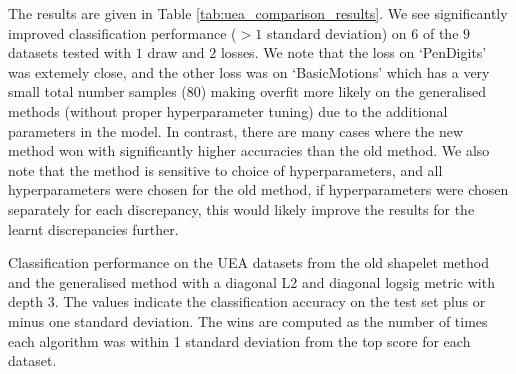 The results are given in Table \ref{tab:uea_comparison_results}. We see significantly improved classification performance ($> 1$ standard deviation) on $6$ of the $9$ datasets tested with $1$ draw and $2$ losses. We note that the loss on `PenDigits' was extemely close, and the other loss was on `BasicMotions' which has a very small total number samples ($80$) making overfit more likely on the generalised methods (without proper hyperparameter tuning) due to the additional parameters in the model. In contrast, there are many cases where the new method won with significantly higher accuracies than the old method. We also note that the method is sensitive to choice of hyperparameters, and all hyperparameters were chosen for the old method, if hyperparameters were chosen separately for each discrepancy, this would likely improve the results for the learnt discrepancies further.
\begin{table}[ht]
    \centering
    \caption{Classification performance on the UEA datasets from the old shapelet method and the generalised method with a diagonal L2 and diagonal logsig metric with depth 3. The values indicate the classification accuracy on the test set plus or minus one standard deviation. The wins are computed as the number of times each algorithm was within 1 standard deviation from the top score for each dataset.}
    \label{tab:uea_comparison_results}
    
\end{table}


